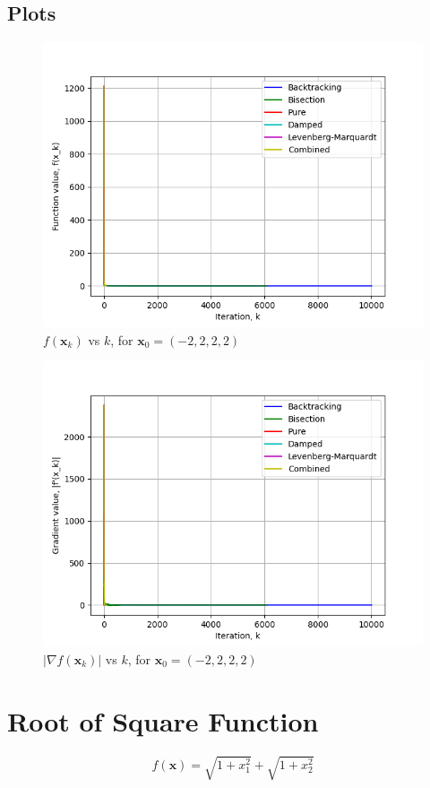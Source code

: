 \documentclass[a4paper]{article}
\begin{document}
\subsection{Plots}

\begin{figure}[H]
      \centering
      \includegraphics[width=.75\textwidth]{rosenbrock_function_vals.png}
      \caption{$f(\textbf{x}_k)$ vs $k$, for $\textbf{x}_0 = (-2, 2, 2, 2)$}
\end{figure}

\begin{figure}[H]
    \centering
    \includegraphics[width=.75\textwidth]{rosenbrock_function_grad.png}
    \caption{$|\nabla f(\textbf{x}_k)|$ vs $k$, for $\textbf{x}_0 = (-2, 2, 2, 2)$}
\end{figure}

\section{Root of Square Function}

$$f(\textbf{x}) = \sqrt{1 + x_1^2} + \sqrt{1 + x_2^2}$$
\end{document}
